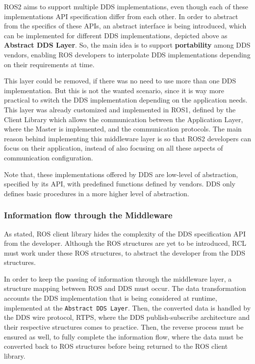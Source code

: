 ROS2 aims to support multiple DDS implementations, even though each of these implementations API specification differ from each other. In order to abstract from the specifics of these APIs, an abstract interface is being introduced, which can be implemented for different DDS implementations, depicted above as \textbf{Abstract DDS Layer}. So, the main idea is to support \textbf{portability} among DDS vendors, enabling ROS developers to interpolate DDS implementations depending on their requirements at time.

This layer could be removed, if there was no need to use more than one DDS implementation. But this is not the wanted scenario, since it is way more practical to switch the DDS implementation depending on the application needs. 
This layer was already customized and implemented in ROS1, defined by the Client Library which allows the communication between the Application Layer, where the Master is implemented, and the communication protocols. The main reason behind implementing this middleware layer is so that ROS2 developers can focus on their application, instead of also focusing on all these aspects of communication configuration. 

Note that, these implementations offered by DDS are low-level of abstraction, specified by its API, with predefined functions defined by vendors. DDS only defines basic procedures in a more higher level of abstraction.


\subsubsection{Information flow through the Middleware}

As stated, ROS client library hides the complexity of the DDS specification API from the developer. Although the ROS structures are yet to be introduced, RCL must work under these ROS structures, to abstract the developer from the DDS structures. 
                    
In order to keep the passing of information through the middleware layer, a structure mapping between ROS and DDS must occur. The data transformation accounts the DDS implementation that is being considered at runtime, implemented at the \texttt{Abstract DDS Layer}. Then, the converted data is handled by the DDS wire protocol, RTPS, where the DDS publish-subscribe architecture and their respective structures comes to practice. Then, the reverse process must be ensured as well, to fully complete the information flow, where the data must be converted back to ROS structures before being returned to the ROS client library.
                    
